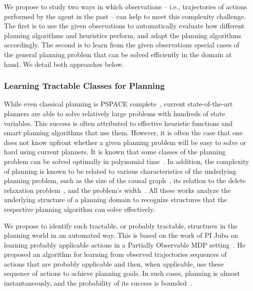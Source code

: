 We propose to study two ways in which observations -- i.e., trajectories of actions performed by the agent in the past -- can help to meet this complexity challenge. The first is to use the given observations to automatically evaluate how different planning algorithms and heuristics perform, and adapt the planning algorithms accordingly. The second is to learn from the given observations special cases of the general planning problem that can be solved efficiently in the domain at hand. We detail both  approaches below. 


\subsubsection{Learning Tractable Classes for Planning}
While even classical planning is PSPACE complete~\cite{bylander1994computational}, 
current state-of-the-art planners are able to solve relatively large problems with hundreds of state variables. This success is often attributed to effective heuristic functions and smart planning algorithms that use them. However, it is often the case that one does not know upfront whether a given planning problem will be easy to solve or hard using current planners. It is known that some classes of the planning problem can be solved optimally in polynomial time~\cite{katz2008new}. In addition, the complexity of planning is known to be related to various characteristics of the underlying planning problem, such as the size of the causal graph~\cite{gimenez2012influence}, its relation to the delete relaxation problem~\cite{hoffmann2011analyzing}, and the problem's width~\cite{lipovetzky2012width}. All these works analyze the underlying structure of a planning domain to recognize structures that the respective planning algorithm can solve effectively. %

We propose to identify such tractable, or probably tractable, structures in the planning world in an automated way. This is based on the work of PI Juba on learning probably applicable 
actions in a Partially Observable MDP setting~\cite{juba2016jmlr}. He proposed 
an algorithm for learning from observed trajectories sequences of actions that are probably applicable and then, when applicable, use these sequence of actions to achieve planning goals. 
In such cases, planning is almost instantaneously, and the probability of its success is bounded~\cite{juba2016jmlr}. 


